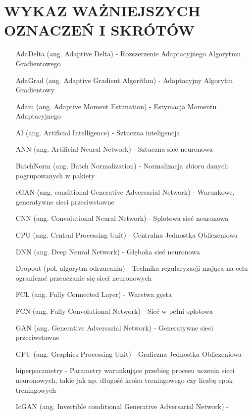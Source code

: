 \section*{WYKAZ WAŻNIEJSZYCH OZNACZEŃ I SKRÓTÓW}

  \bigskip

  \begin{itemize}
    \item[AdaDelta] (ang. Adaptive Delta) - Rozszerzenie Adaptacyjnego Algorytmu Gradientowego
    \item[AdaGrad] (ang. Adaptive Gradient Algorithm) - Adaptacyjny Algorytm Gradientowy
    \item[Adam] (ang. Adaptive Moment Estimation) - Estymacja Momentu Adaptacyjnego
    \item[AI] (ang. Artificial Intelligence) - Sztuczna inteligencja
    \item[ANN] (ang. Artificial Neural Network) - Sztuczna sieć neuronowa
    \item[BatchNorm] (ang. Batch Normalization) - Normalizacja zbioru danych
    pogrupowanych w pakiety
    \item[cGAN] (ang. conditional Generative Adversarial Network) - Warunkowe,
    generatywne sieci przeciwstawne
    \item[CNN] (ang. Convolutional Neural Network) - Splotowa sieć neuronowa
    \item[CPU] (ang. Central Processing Unit) - Centralna Jednostka Obliczeniowa
    \item[DNN] (ang. Deep Neural Network) - Głęboka sieć neuronowa
    \item[Dropout] (pol. algorytm odrzucania) - Technika
    regularyzacji mająca na celu ograniczać przeuczanie się sieci neuronowych
    \item[FCL] (ang. Fully Connected Layer) - Warstwa gęsta
    \item[FCN] (ang. Fully Convolutional Network) - Sieć w pełni splotowa
    \item[GAN] (ang. Generative Adversarial Network) - Generatywne sieci
    przeciwstawne
    \item[GPU] (ang. Graphics Processing Unit) - Graficzna Jednostka Obliczeniowa
    \item[hiperparametry] - Parametry warunkujące przebieg procesu uczenia sieci neuronowych,
    takie jak np. długość kroku treningowego czy liczbę epok treningowych
    \item[IcGAN] (ang. Invertible conditional Generative Adversarial Network) -

\end{itemize}
